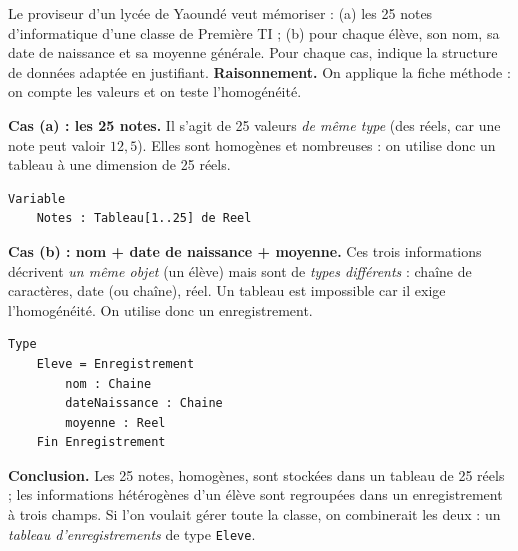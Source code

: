 \documentclass[11pt]{article}
\newcommand{\cle}[1]{{\popxbold\color{popdark}#1}}
\begin{document}
\begin{exoresolu}
Le proviseur d'un lycée de Yaoundé veut mémoriser : (a) les 25 notes d'informatique d'une classe de Première TI ; (b) pour chaque élève, son nom, sa date de naissance et sa moyenne générale. Pour chaque cas, indique la structure de données adaptée en justifiant.
\tcblower
\textbf{Raisonnement.} On applique la fiche méthode : on compte les valeurs et on teste l'homogénéité.

\textbf{Cas (a) : les 25 notes.} Il s'agit de 25 valeurs \emph{de même type} (des réels, car une note peut valoir $12{,}5$). Elles sont homogènes et nombreuses : on utilise donc un \cle{tableau} à une dimension de 25 réels.
\begin{lstlisting}
Variable
    Notes : Tableau[1..25] de Reel
\end{lstlisting}

\textbf{Cas (b) : nom + date de naissance + moyenne.} Ces trois informations décrivent \emph{un même objet} (un élève) mais sont de \emph{types différents} : chaîne de caractères, date (ou chaîne), réel. Un tableau est impossible car il exige l'homogénéité. On utilise donc un \cle{enregistrement}.
\begin{lstlisting}
Type
    Eleve = Enregistrement
        nom : Chaine
        dateNaissance : Chaine
        moyenne : Reel
    Fin Enregistrement
\end{lstlisting}

\textbf{Conclusion.} Les 25 notes, homogènes, sont stockées dans un tableau de 25 réels ; les informations hétérogènes d'un élève sont regroupées dans un enregistrement à trois champs. Si l'on voulait gérer toute la classe, on combinerait les deux : un \emph{tableau d'enregistrements} de type \texttt{Eleve}.
\end{exoresolu}
\end{document}
